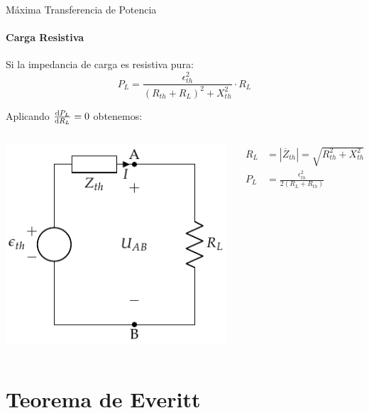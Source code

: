 \documentclass[aspectratio=169, usenames,svgnames,dvipsnames]{beamer}
\begin{document}
\begin{frame}[label={sec:orgd60c225}]{Máxima Transferencia de Potencia}
\framesubtitle{Carga Resistiva}

Si la impedancia de carga es resistiva pura:
\[
  P_L = \frac{\epsilon^2_{th}}{(R_{th} + R_L)^2 + X_{th}^2} \cdot R_L
\]

Aplicando \(\diff{P_L}{R_L} = 0\) obtenemos:

\begin{columns}
\begin{column}{0.5\columnwidth}
\begin{center}
\includegraphics[height=0.5\textheight]{../figs/EquivalenteThevenin_RL.pdf}
\end{center}
\end{column}

\begin{column}{0.5\columnwidth}
\begin{align*}
      R_L &= |\overline{Z}_{th}| = \sqrt{R_{th}^2 + X_{th}^2}\\
      P_L &= \frac{\epsilon^2_{th}}{2(R_L + R_{th})}
\end{align*}
\end{column}
\end{columns}
\end{frame}


\section{Teorema de Everitt}
\label{sec:org9041f85}
\end{document}
